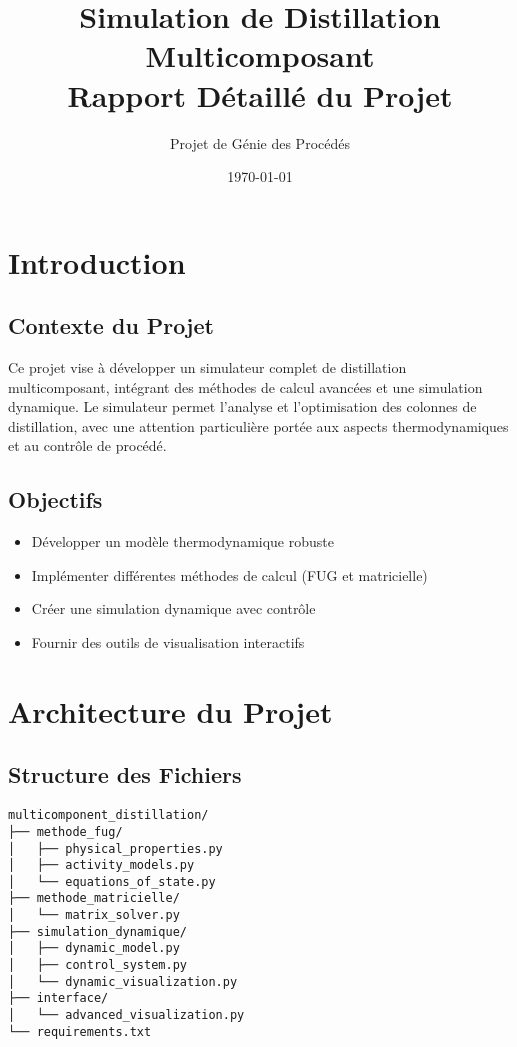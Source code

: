 \documentclass[12pt,a4paper]{report}
\title{Simulation de Distillation Multicomposant\\
       \large Rapport Détaillé du Projet}
\author{Projet de Génie des Procédés}
\date{\today}
\begin{document}
\maketitle
\tableofcontents

\chapter{Introduction}
\section{Contexte du Projet}
Ce projet vise à développer un simulateur complet de distillation multicomposant, intégrant des méthodes de calcul avancées et une simulation dynamique. Le simulateur permet l'analyse et l'optimisation des colonnes de distillation, avec une attention particulière portée aux aspects thermodynamiques et au contrôle de procédé.

\section{Objectifs}
\begin{itemize}
    \item Développer un modèle thermodynamique robuste
    \item Implémenter différentes méthodes de calcul (FUG et matricielle)
    \item Créer une simulation dynamique avec contrôle
    \item Fournir des outils de visualisation interactifs
\end{itemize}

\chapter{Architecture du Projet}
\section{Structure des Fichiers}
\begin{verbatim}
multicomponent_distillation/
├── methode_fug/
│   ├── physical_properties.py
│   ├── activity_models.py
│   └── equations_of_state.py
├── methode_matricielle/
│   └── matrix_solver.py
├── simulation_dynamique/
│   ├── dynamic_model.py
│   ├── control_system.py
│   └── dynamic_visualization.py
├── interface/
│   └── advanced_visualization.py
└── requirements.txt
\end{verbatim}
\end{document}
